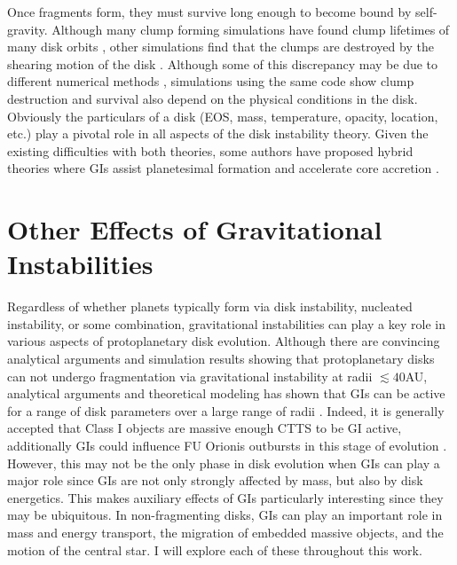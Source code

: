 Once fragments form, they must survive long enough to become bound by self-gravity. Although many clump forming simulations have found clump lifetimes of many disk orbits \citep{boss2003,rice2003b,mayer2004}, other simulations find that the clumps are destroyed by the shearing motion of the disk \citep{pickett2003,mejia2005}. Although some of this discrepancy may be due to different numerical methods \citep{pickett2007}, simulations using the same code show clump destruction and survival also depend on the physical conditions in the disk. Obviously the particulars of a disk (EOS, mass, temperature, opacity, location, etc.) play a pivotal role in all aspects of the disk instability theory. Given the existing difficulties with both theories, some authors have proposed hybrid theories where GIs assist planetesimal formation and accelerate core accretion \citep{hag2003b,rice2004,rice2006,durisen2005}.

\section{Other Effects of Gravitational Instabilities}\label{sec:xtraeffect}

Regardless of whether planets typically form via disk instability, nucleated instability, or some combination, gravitational instabilities can play a key role in various aspects of protoplanetary disk evolution. Although there are convincing analytical arguments \citep{rafikov2005,rafikov2007} and simulation results showing \citep{nelson2000a,cai2006,boley2006,boley2007b,stamatellos2008,boley2008} that protoplanetary disks can not undergo fragmentation via gravitational instability at radii $\lesssim 40$AU, analytical arguments and theoretical modeling has shown that GIs can be active for a range of disk parameters over a large range of radii \citep{vorobyov2008,vorobyov2009,rafikov2009,zhu2009}. Indeed, it is generally accepted that Class I objects are massive enough CTTS to be GI active, additionally GIs could influence FU Orionis outbursts in this stage of evolution \citep{armitage2001,vorobyov2006,boley2008,zhu2009}. However, this may not be the only phase in disk evolution when GIs can play a major role \citep[c.f.][]{zhu2010} since GIs are not only strongly affected by mass, but also by disk energetics. This makes auxiliary effects of GIs particularly interesting since they may be ubiquitous. In non-fragmenting disks, GIs can play an important role in mass and energy transport, the migration of embedded massive objects, and the motion of the central star. I will explore each of these throughout this work.    

